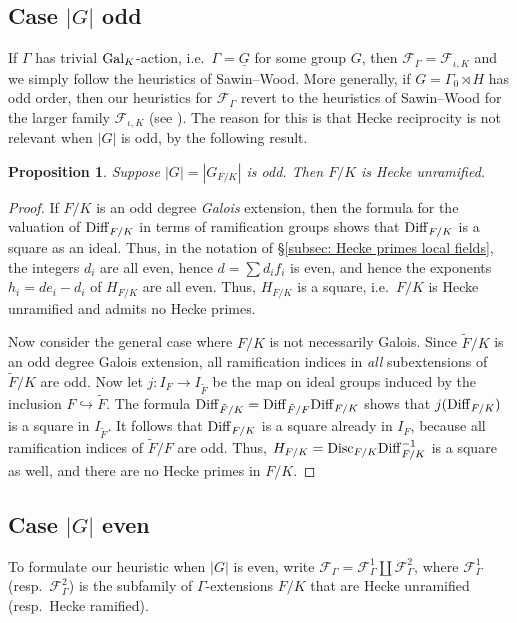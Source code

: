 \documentclass[11pt,a4paper]{amsart}
\def\Diff{{\rm Diff}}
\def\Disc{{\rm Disc}}
\def\Gal{{\rm Gal}}
\numberwithin{equation}{section}
\newtheorem{proposition}[theorem]{Proposition}
\begin{document}
\subsection{Case $|G|$ odd}

If $\Gamma$ has trivial $\Gal_K$-action, i.e.\ $\Gamma = \underline{G}$ for some group $G$, then $\mathcal{F}_\Gamma = \mathcal{F}_{\iota, K}$ and we simply follow the heuristics of Sawin--Wood. More generally, if $G =  \Gamma_0 \rtimes H$ has odd order, then our heuristics for $\mathcal{F}_\Gamma$ revert to the  heuristics of Sawin--Wood for the larger family $\mathcal{F}_{\iota, K}$ (see \cite[\S10]{SawinWood}). The reason for this is that Hecke reciprocity is not relevant when $|G|$ is odd, by the following result.

\begin{proposition}\label{prop: G odd}
    Suppose $|G| = |G_{F/K}|$ is odd. Then $F/K$ is Hecke unramified. 
\end{proposition}
\begin{proof}
    If $F/K$ is an odd degree {\it Galois} extension, then the formula \cite[p. 64]{Serre1979} for the valuation of $\Diff_{F/K}$ in terms of ramification groups shows that $\Diff_{F/K}$ is a square as an ideal. Thus, in the notation of \S\ref{subsec: Hecke primes local fields}, the integers $d_i$ are all even, hence  $d = \sum d_i f_i$ is even, and hence the exponents $h_i = de_i - d_i$ of $H_{F/K}$ are all even. Thus, $H_{F/K}$ is a square, i.e.\ $F/K$ is Hecke unramified and admits no Hecke primes. 
    
    Now consider the general case where $F/K$ is not necessarily Galois. Since $\tilde F/K$ is an odd degree Galois extension, all ramification indices in {\it all} subextensions of $\tilde F/K$ are odd. Now let $j \colon I_F \to I_{\tilde F}$ be the map on ideal groups induced by the inclusion $F \hookrightarrow \tilde{F}$. The formula $\Diff_{\tilde F/K} = \Diff_{\tilde F/F} \Diff_{F/K}$ shows that $j(\Diff_{F/K})$ is a square in $I_{\tilde F}$. It follows that $\Diff_{F/K}$ is a square already in $I_F$, because all ramification indices of $\tilde F/F$ are odd. Thus, $H_{F/K} = \Disc_{F/K}\Diff_{F/K}^{-1}$ is a square as well, and there are no Hecke primes in $F/K$.   
\end{proof}

\subsection{Case $|G|$ even}
To formulate our heuristic when $|G|$ is even, write $\mathcal{F}_\Gamma = \mathcal{F}_\Gamma^1 \coprod \mathcal{F}_\Gamma^2$, where $\mathcal{F}_\Gamma^1$ (resp.\ $\mathcal{F}_\Gamma^2$) is the subfamily of $\Gamma$-extensions $F/K$ that are Hecke unramified (resp.\ Hecke ramified).  
\end{document}
